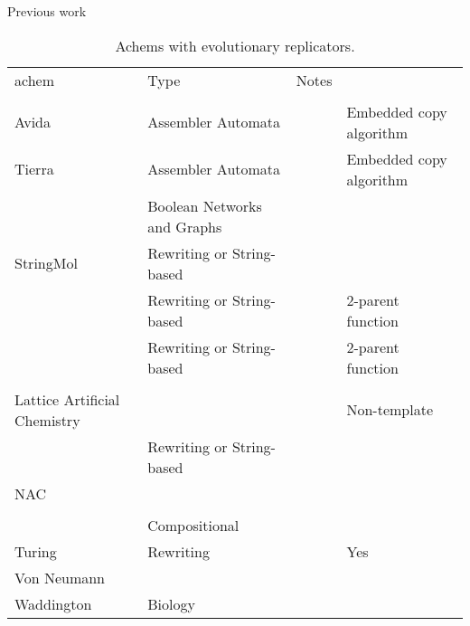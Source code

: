 
\begin{sidewaystable}
	\begin{center}
		\scriptsize
		\caption{Previous work}
		\label{tb:previous-work}
		\begin{tabular}{@{}llll@{}}
			\hline\noalign{\smallskip}
			\Gls{achem}                                                     & Type 	& Notes\\ 
			\\ \noalign{\smallskip}
			\hline
			\noalign{\smallskip}
			
			Avida \cite{Ofria2004}                                  		&Assembler Automata&	& Embedded copy algorithm\\
			Tierra \cite{Ray1991}                                  			&Assembler Automata&	& Embedded copy algorithm\\
			\cite{Nellis2012}\cite{Nellis2014}								&Boolean Networks and Graphs&&\\
			StringMol \cite{Hickinbotham2012}                             	&Rewriting or String-based&&\\
			\cite{Fontana1992}												&Rewriting or String-based&&2-parent function\\
			\cite{Dittrich1998}												&Rewriting or String-based&&2-parent function\\
\hline
			\cite{Nowostawski2005}											&&&\\		
			Lattice Artificial Chemistry \cite{Ono2000,Madina2003}        	&&&Non-template\\
			\cite{Fenizio2000}\cite{Fenizio2001}							&Rewriting or String-based&&\\			
			NAC \cite{Suzuki2006}                                         	&&&\\	
			\cite{Gardiner2007}                                             &&&\\
\hline			
			\cite{Kauffman1986}												&Compositional&&\\
			Turing															&Rewriting 	&&Yes\\
			Von Neumann														&&&\\
			Waddington														&Biology&&\\
			\hline
		\end{tabular}
	\end{center}
	\caption{Achems with evolutionary replicators.}
\end{sidewaystable}

